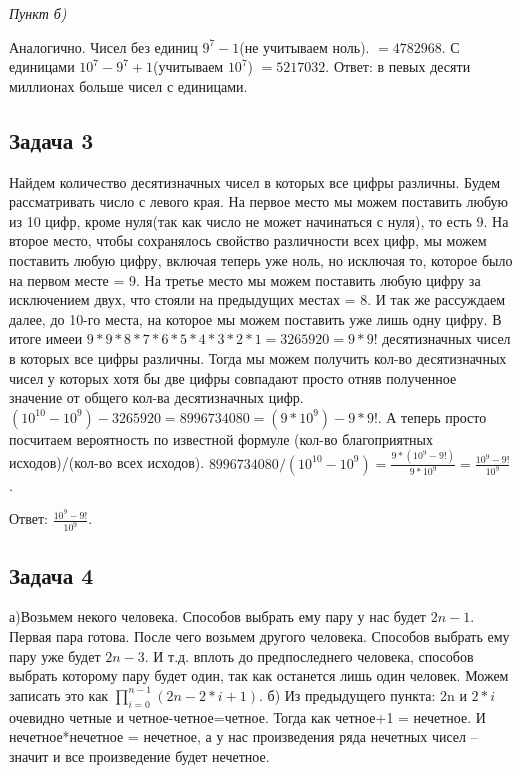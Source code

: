 	\textit{Пункт б)}	
	
	Аналогично. Чисел без единиц $9^7 - 1$(не учитываем ноль). $ = 4782968$.
	С единицами $10^7 - 9^7 + 1$(учитываем $10^7$) $= 5217032$. 
	Ответ: в певых десяти миллионах больше чисел с единицами. 
	
	\subsection{Задача 3}
	Найдем количество десятизначных чисел в которых все цифры различны. Будем рассматривать число с левого края. На первое место мы можем поставить любую из 10 цифр, кроме нуля(так как число не может начинаться с нуля), то есть 9. На второе место, чтобы сохранялось свойство различности всех цифр, мы можем поставить любую цифру, включая теперь уже ноль, но исключая то, которое было на первом месте = 9. На третье место мы можем поставить любую цифру за исключением двух, что стояли на предыдущих местах = 8. И так же рассуждаем далее, до 10-го места, на которое мы можем поставить  уже лишь одну цифру. В итоге имееи $9*9*8*7*6*5*4*3*2*1 = 3265920 = 9 * 9!$  десятизначных чисел в которых все цифры различны.
	Тогда мы можем получить кол-во десятизначных чисел у которых хотя бы две цифры совпадают просто отняв полученное значение от общего кол-ва десятизначных цифр. $(10^10 - 10^9) - 3265920 = 8996734080 = (9 * 10^9) - 9 * 9!$.
	А теперь просто посчитаем вероятность по известной формуле (кол-во благоприятных исходов)/(кол-во всех исходов).
	$8996734080 / (10^10 - 10^9) = \frac{9*(10^9 - 9!)}{9 * 10^9} = \frac{10^9 - 9!}{10^9}$.
	
	Ответ: $\frac{10^9 - 9!}{10^9}$.
	
	\subsection{Задача 4}
	а)Возьмем некого человека. Способов выбрать ему пару у нас будет $2n - 1$. Первая пара готова. После чего возьмем другого человека. Способов выбрать ему пару уже будет $2n - 3$. И т.д. вплоть до предпоследнего человека, способов выбрать которому пару будет один, так как останется лишь один человек.
	Можем записать это как $\prod_{i = 0}^{n - 1} (2n - 2 * i + 1)$.
	б) Из предыдущего пункта: 2n и $2 * i$ очевидно четные и четное-четное=четное. Тогда как четное+1 = нечетное. И нечетное*нечетное = нечетное, а у нас произведения ряда нечетных чисел -- значит и все произведение будет нечетное.
	
	

